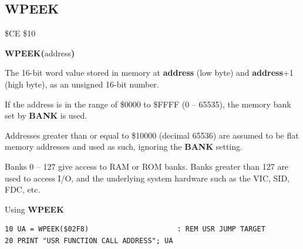 
\newpage
\subsection{WPEEK}
\begin{description}[leftmargin=2cm,style=nextline]
\item [Token:]    \$CE \$10

\item [Format:]   {\bf WPEEK(}address{\bf)}

\item [Returns:]  The 16-bit word value stored in memory at {\bf address} (low byte) and {\bf address}+1 (high byte), as an unsigned 16-bit number.

                  If the address is in the range of \$0000 to \$FFFF (0 -- 65535), the memory bank set by {\bf BANK} is used.

                  Addresses greater than or equal to \$10000 (decimal 65536) are assumed to be flat memory addresses and used as such, ignoring the {\bf BANK} setting.

\item [Remarks:]  Banks 0 -- 127 give access to RAM or ROM banks. Banks greater than 127 are used to access I/O, and the underlying system hardware such as the VIC, SID, FDC, etc.

\item [Example:]  Using {\bf WPEEK}

\begin{tcolorbox}[colback=black,coltext=white]
\verbatimfont{\codefont}
\begin{verbatim}
10 UA = WPEEK($02F8)                     : REM USR JUMP TARGET
20 PRINT "USR FUNCTION CALL ADDRESS"; UA
\end{verbatim}
\end{tcolorbox}
\end{description}


\newpage
